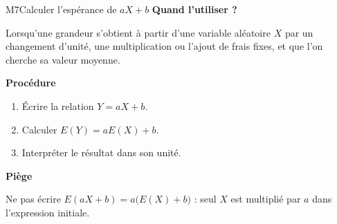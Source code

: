 \begin{fichemethode}{M7}{Calculer l'espérance de $aX+b$}
  \textbf{Quand l'utiliser ?}

  Lorsqu'une grandeur s'obtient à partir d'une variable aléatoire $X$ par un
  changement d'unité, une multiplication ou l'ajout de frais fixes, et que
  l'on cherche sa valeur moyenne.

  \textbf{Procédure}
  \begin{enumerate}
    \item Écrire la relation $Y=aX+b$.
    \item Calculer $E(Y)=aE(X)+b$.
    \item Interpréter le résultat dans son unité.
  \end{enumerate}

  \textbf{Piège}

  Ne pas écrire $E(aX+b)=a\bigl(E(X)+b\bigr)$ : seul $X$ est multiplié par
  $a$ dans l'expression initiale.
\end{fichemethode}
